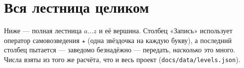 \section{Вся лестница целиком}

Ниже --- полная лестница \(a \dots z\) и её вершина. Столбец «Запись» использует
оператор самовозведения \(\star\) (одна звёздочка на каждую букву), а последний столбец
пытается --- заведомо безнадёжно --- передать, \emph{насколько} это много. Числа взяты из
того же расчёта, что и весь проект (\texttt{docs/data/levels.json}).


